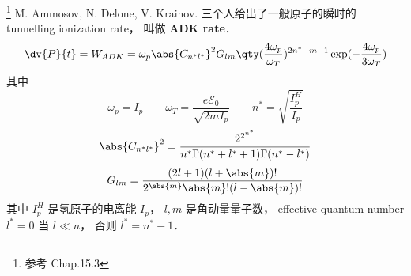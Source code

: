 
\begin{issues}
\issueDraft
\end{issues}

\footnote{参考 \cite{Bransden} Chap.15.3} M. Ammosov, N. Delone, V. Krainov. 三个人给出了一般原子的瞬时的 tunnelling ionization rate， 叫做 \textbf{ADK rate}．
\begin{equation}
\dv{P}{t} = W_{ADK} = \omega_p \abs{C_{n^*l^*}}^2 G_{lm}\qty(\frac{4\omega_p}{\omega_T})^{2n^*-m-1}\exp(-\frac{4\omega_p}{3\omega_T})
\end{equation}
其中
\begin{equation}
\omega_p = I_p \qquad \omega_T = \frac{e\mathcal E_0}{\sqrt{2mI_p}} \qquad
n^* = \sqrt{\frac{I_p^H}{I_p}}
\end{equation}
\begin{equation}
\abs{C_{n^*l^*}}^2 = \frac{2^{2^{n^*}}}{n^* \Gamma(n^* + l^* + 1) \Gamma(n^* - l^*)}
\end{equation}
\begin{equation}
G_{lm} = \frac{(2l+1)(l+\abs{m})!}{2^{\abs{m}}\abs{m}!(l-\abs{m})!}
\end{equation}
其中 $I_p^H$ 是氢原子的电离能 $I_p$， $l,m$ 是角动量量子数， effective quantum number $l^* = 0$ 当 $l\ll n$， 否则 $l^* = n^*-1$．